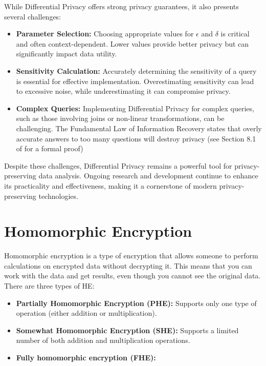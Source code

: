 While Differential Privacy offers strong privacy guarantees, it also presents several challenges:

\begin{itemize}
    \item \textbf{Parameter Selection:} Choosing appropriate values for $\epsilon$ and $\delta$ is critical and often context-dependent. Lower values provide better privacy but can significantly impact data utility.
    \item \textbf{Sensitivity Calculation:} Accurately determining the sensitivity of a query is essential for effective implementation. Overestimating sensitivity can lead to excessive noise, while underestimating it can compromise privacy.
    \item \textbf{Complex Queries:} Implementing Differential Privacy for complex queries, such as those involving joins or non-linear transformations, can be challenging. The Fundamental Law of Information Recovery states that overly accurate answers to too many questions will destroy privacy (see Section 8.1 of \cite{dwork2013} for a formal proof)
\end{itemize}

Despite these challenges, Differential Privacy remains a powerful tool for privacy-preserving data analysis. Ongoing research and development continue to enhance its practicality and effectiveness, making it a cornerstone of modern privacy-preserving technologies.



\section{Homomorphic Encryption}

Homomorphic encryption is a type of encryption that allows someone to perform calculations on encrypted data without decrypting it. This means that you can work with the data and get results, even though you cannot see the original data.
There are three types of HE:

\begin{itemize}
    \item \textbf{Partially Homomorphic Encryption (PHE):} Supports only one type of operation (either addition or multiplication).
    \item \textbf{Somewhat Homomorphic Encryption (SHE):} Supports a limited number of both addition and multiplication operations.
    \item \textbf{Fully homomorphic encryption (FHE):}
\end{itemize}

